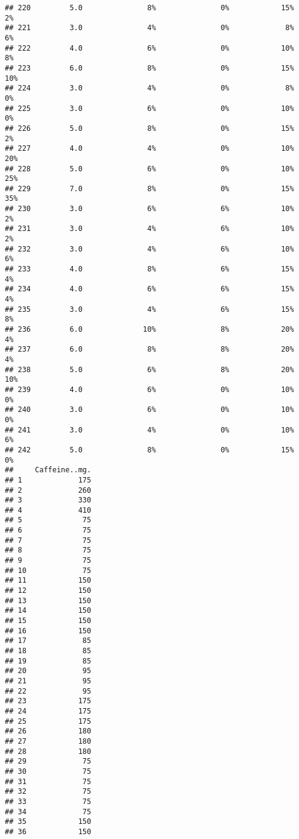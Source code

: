 \documentclass[
]{article}
\begin{document}
\begin{verbatim}
## 220         5.0               8%               0%            15%          2%
## 221         3.0               4%               0%             8%          6%
## 222         4.0               6%               0%            10%          8%
## 223         6.0               8%               0%            15%         10%
## 224         3.0               4%               0%             8%          0%
## 225         3.0               6%               0%            10%          0%
## 226         5.0               8%               0%            15%          2%
## 227         4.0               4%               0%            10%         20%
## 228         5.0               6%               0%            10%         25%
## 229         7.0               8%               0%            15%         35%
## 230         3.0               6%               6%            10%          2%
## 231         3.0               4%               6%            10%          2%
## 232         3.0               4%               6%            10%          6%
## 233         4.0               8%               6%            15%          4%
## 234         4.0               6%               6%            15%          4%
## 235         3.0               4%               6%            15%          8%
## 236         6.0              10%               8%            20%          4%
## 237         6.0               8%               8%            20%          4%
## 238         5.0               6%               8%            20%         10%
## 239         4.0               6%               0%            10%          0%
## 240         3.0               6%               0%            10%          0%
## 241         3.0               4%               0%            10%          6%
## 242         5.0               8%               0%            15%          0%
##     Caffeine..mg.
## 1             175
## 2             260
## 3             330
## 4             410
## 5              75
## 6              75
## 7              75
## 8              75
## 9              75
## 10             75
## 11            150
## 12            150
## 13            150
## 14            150
## 15            150
## 16            150
## 17             85
## 18             85
## 19             85
## 20             95
## 21             95
## 22             95
## 23            175
## 24            175
## 25            175
## 26            180
## 27            180
## 28            180
## 29             75
## 30             75
## 31             75
## 32             75
## 33             75
## 34             75
## 35            150
## 36            150

\end{verbatim}
\end{document}
